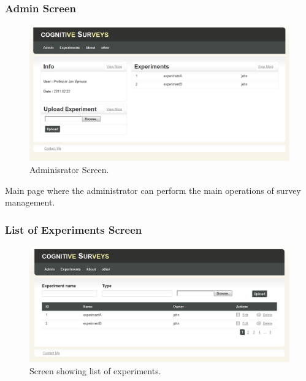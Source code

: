 \documentclass[a4paper,12pt,oneside]{report}
\begin{document}
\newpage
\subsubsection{Admin Screen}
\begin{figure}[hp!!]
  \begin{center}
   \includegraphics[width=14cm]{pics/adminPage.png}
  \end{center}
\caption{Adminisrator Screen.}
\end{figure}
Main page where the administrator can perform the main operations of survey management.
\subsubsection{List of Experiments Screen}
\begin{figure}[hp!!]
  \begin{center}
   \includegraphics[width=14cm]{pics/experiments.png}
  \end{center}
\caption{Screen showing list of experiments.}
\end{figure}

\newpage
\end{document}

